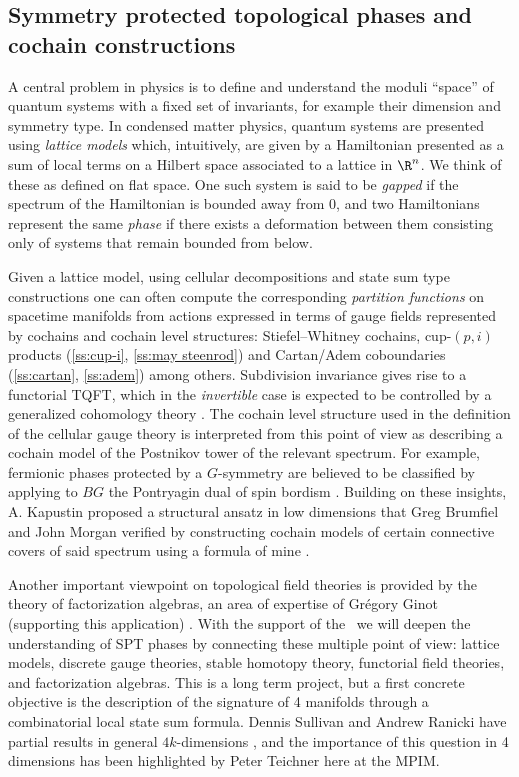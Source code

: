 \subsection{Symmetry protected topological phases and cochain constructions} \label{ss:spt phases}

A central problem in physics is to define and understand the moduli ``space'' of quantum systems with a fixed set of invariants, for example their dimension and symmetry type.
In condensed matter physics, quantum systems are presented using \textit{lattice models} which, intuitively, are given by a Hamiltonian presented as a sum of local terms on a Hilbert space associated to a lattice in $\R^n$.
We think of these as defined on flat space.
One such system is said to be \textit{gapped} if the spectrum of the Hamiltonian is bounded away from $0$, and two Hamiltonians represent the same \textit{phase} if there exists a deformation between them consisting only of systems that remain bounded from below.

Given a lattice model, using cellular decompositions and state sum type constructions one can often compute the corresponding \textit{partition functions} on spacetime manifolds from actions expressed in terms of gauge fields represented by cochains and cochain level structures: Stiefel--Whitney cochains, cup-$(p, i)$ products (\cref{ss:cup-i}, \cref{ss:may steenrod}) and Cartan/Adem coboundaries (\cref{ss:cartan}, \cref{ss:adem}) among others.
Subdivision invariance gives rise to a functorial TQFT, which in the \textit{invertible} case is expected to be controlled by a generalized cohomology theory \cite{freed2021reflection}.
The cochain level structure used in the definition of the cellular gauge theory is interpreted from this point of view as describing a cochain model of the Postnikov tower of the relevant spectrum.
For example, fermionic phases protected by a $G$-symmetry are believed to be classified by applying to $BG$ the Pontryagin dual of spin bordism \cite{kapustin2015cobordism, kapustin2017fermionic}.
Building on these insights, A. Kapustin proposed a structural ansatz in low dimensions that Greg Brumfiel and John Morgan verified by constructing cochain models of certain connective covers of said spectrum \cite{brumfiel2016pontrjagin, brumfiel2018pontrjagin} using a formula of mine \cite{medina2020cartan}.

Another important viewpoint on topological field theories is provided by the theory of factorization algebras, an area of expertise of Gr\'egory Ginot (supporting this application) \cite{ginot2015factorization.algebras}.
With the support of the \grantName\ we will deepen the understanding of SPT phases by connecting these multiple point of view: lattice models, discrete gauge theories, stable homotopy theory, functorial field theories, and factorization algebras.
This is a long term project, but a first concrete objective is the description of the signature of 4 manifolds through a combinatorial local state sum formula.
Dennis Sullivan and Andrew Ranicki have partial results in general $4k$-dimensions \cite{sullivan1976signature}, and the importance of this question in 4 dimensions has been highlighted by Peter Teichner here at the MPIM.
